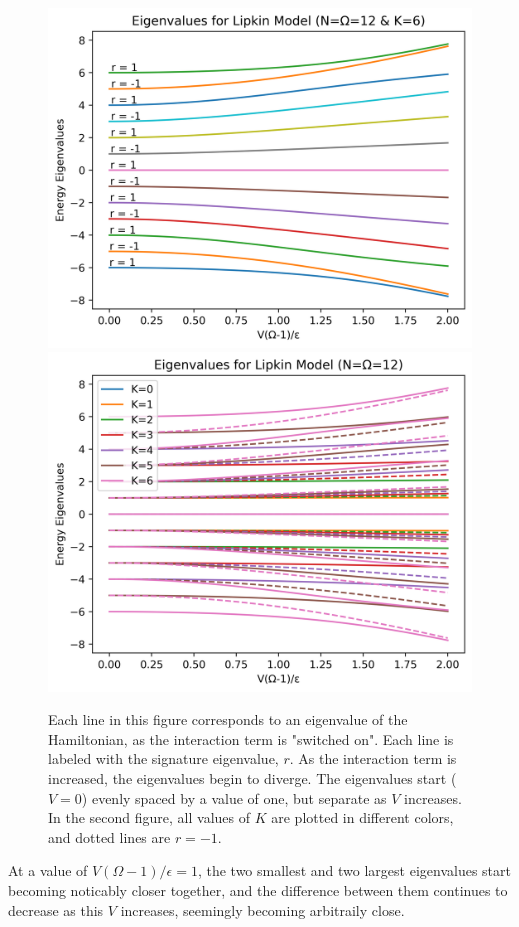\documentclass[
a4paper,
10pt,
twoside,
]{article}
\begin{document}
\begin{figure}[H]
	\centering
	\includegraphics[width=0.8\linewidth]{figures/eigenvaluePlotK6.png}
	\includegraphics[width=0.8\linewidth]{figures/eigenvaluePlotAllK.png}
	\caption{
		Each line in this figure corresponds to an eigenvalue of the Hamiltonian, as the interaction term is "switched on".
		Each line is labeled with the signature eigenvalue, $r$.
		As the interaction term is increased, the eigenvalues begin to diverge.
		The eigenvalues start ($V=0$) evenly spaced by a value of one, but separate as $V$ increases.
		In the second figure, all values of $K$ are plotted in different colors, and dotted lines are $r=-1$.
	}
	\label{fig: eigenvalues}
\end{figure}

At a value of $V(\Omega-1)/\epsilon = 1$, the two smallest and two largest eigenvalues start becoming noticably closer together, and the difference between them continues to decrease as this $V$ increases, seemingly becoming arbitraily close.
\end{document}
